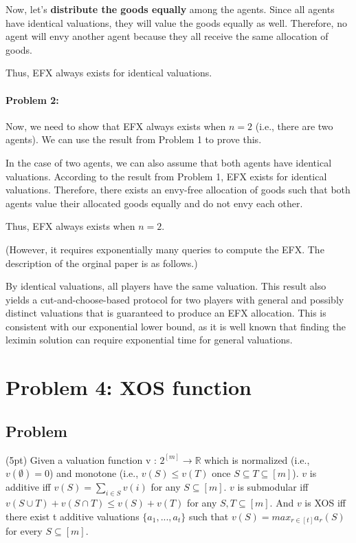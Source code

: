 \documentclass{article}
\renewenvironment{quote}{%
  \def\FrameCommand{{\color{mygray}\vrule width 3pt}\hspace{10pt}}%
  \MakeFramed {\advance\hsize-\width \FrameRestore}}%
{\endMakeFramed}
\begin{document}
Now, let's \textbf{distribute the goods equally} among the agents. Since all agents have identical valuations, they will value the goods equally as well. Therefore, no agent will envy another agent because they all receive the same allocation of goods.

Thus, EFX always exists for identical valuations.

\paragraph{Problem 2:}
Now, we need to show that EFX always exists when $n=2$ (i.e., there are two agents). We can use the result from Problem 1 to prove this.

In the case of two agents, we can also assume that both agents have identical valuations. According to the result from Problem 1, EFX exists for identical valuations. Therefore, there exists an envy-free allocation of goods such that both agents value their allocated goods equally and do not envy each other.

Thus, EFX always exists when $n=2$. 

(However, it requires exponentially many queries to compute the EFX.\cite{DBLP:journals/corr/PlautR17} The description of the orginal paper is as follows.)

\begin{quote}
   By identical valuations, all players have the same
valuation. This result also yields a cut-and-choose-based protocol for two players with general and possibly distinct valuations that is guaranteed to produce an EFX allocation. This is consistent
with our exponential lower bound, as it is well known that finding the leximin solution can require exponential time for general valuations.
\end{quote}

\section{Problem 4: XOS function}

\subsection{Problem}(5pt) Given a valuation function v : $2^{[m]} \rightarrow \mathbb{R}$ which is normalized (i.e., $v(\emptyset) = 0$) and
monotone (i.e., $v(S) \le v(T)$ once $S \subseteq T \subseteq [m]$). $v$ is additive iff $v(S) = \sum_{i \in S} v(i)$ for any $S \subseteq [m]$. $v$ is submodular iff $v(S \cup T) + v(S \cap T) \le v(S) + v(T)$ for any $S, T \subseteq [m]$. And $v$ is XOS iff there exist t additive valuations $\{a_1, . . . , a_t\}$ such that $v(S) = max_{r \in [t]} a_r(S)$ for every $S \subseteq [m]$.
\end{document}
